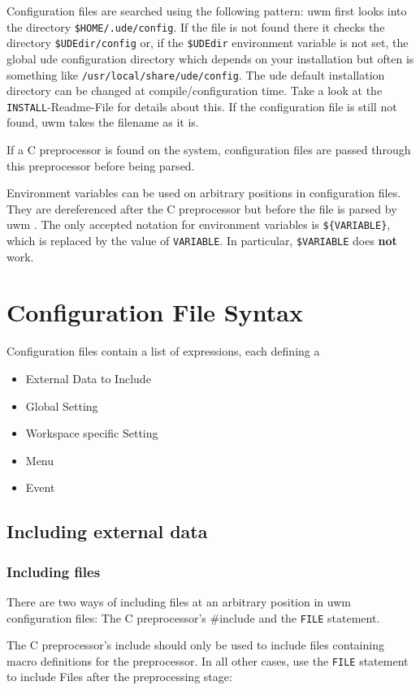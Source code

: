 \documentclass[10pt,a4paper]{article}
\newcommand{\uwm}{{\sc uwm} }
\newcommand{\ude}{{\sc ude} }
\begin{document}
Configuration files are searched using the following pattern: \uwm first looks
into the directory \texttt{\$HOME/.ude/config}. If the file is not found there
it checks the directory \texttt{\$UDEdir/config} or, if the \texttt{\$UDEdir}
environment variable is not set, the global \ude configuration directory which
depends on your installation but often is something like
\texttt{/usr/local/share/ude/config}. The \ude
default installation directory can be changed at compile/configuration time.
Take a look at the \texttt{INSTALL}-Readme-File for details about this. If the
configuration file is still not found, \uwm takes the filename as it is.

If a C preprocessor is found on the system, configuration files are passed
through this preprocessor before being parsed.

Environment variables can be used on arbitrary positions in configuration
files. They are dereferenced after the C preprocessor but before the file is
parsed by \uwm. The only accepted notation for environment variables is
\texttt{\$\{VARIABLE\}}, which is replaced by the value of \texttt{VARIABLE}.
In particular, \texttt{\$VARIABLE} does \textbf{not} work.

\section{Configuration File Syntax}
Configuration files contain a list of expressions, each defining a
\begin{itemize}
\item External Data to Include
\item Global Setting
\item Workspace specific Setting
\item Menu
\item Event
\end{itemize}

\subsection{Including external data}
\subsubsection{Including files}
There are two ways of including files at an arbitrary position in uwm
configuration files: The C preprocessor's \#include and the \texttt{FILE}
statement.

The C preprocessor's include should only be used to include files containing
macro definitions for the preprocessor. In all other cases, use the
\texttt{FILE} statement to include Files after the preprocessing stage:
\end{document}
